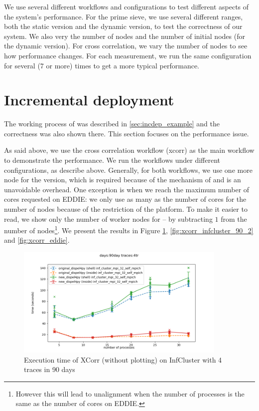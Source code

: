 We use several different workflows and configurations to test different aspects of the system's performance. For the prime sieve, we use several different ranges, both the static version and the dynamic version, to test the correctness of our system. We also very the number of nodes and the number of initial nodes (for the dynamic version). For cross correlation, we vary the number of nodes to see how performance changes. For each measurement, we run the same configuration for several (7 or more) times to get a more typical performance.

\section{Incremental deployment}
The working process of \tincdep was described in \ref{sec:incdep_example} and the correctness was also shown there. This section focuses on the performance issue.

As said above, we use the cross correlation workflow (xcorr) as the main workflow to demonstrate the performance. We run the workflows under different configurations, as describe above. Generally, for both workflows, we use one more node for the \tincdep version, which is required because of the mechanism of \tincdep and is an unavoidable overhead. One exception is when we reach the maximum number of cores requested on EDDIE: we only use as many as the number of cores for the number of nodes because of the restriction of the platform. To make it easier to read, we show only the number of worker nodes for \tincdep -- by subtracting $1$ from the number of nodes\footnote{However this will lead to unalignment when the number of processes is the same  as the number of cores on EDDIE.}. We present the results in Figure \ref{fig:xcorr_infcluster}, \ref{fig:xcorr_infcluster_90_2} and \ref{fig:xcorr_eddie}.

\begin{figure}[h]
\centering
    \includegraphics[width=0.9\textwidth]{figures/xcorr_infcluster_90day_4tr}
\caption{Execution time of XCorr (without plotting) on InfCluster with 4 traces in 90 days}
\label{fig:xcorr_infcluster}
\end{figure}

